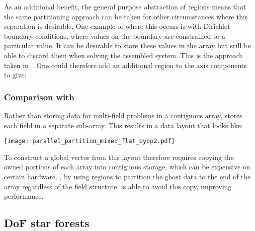 \documentclass[thesis]{subfiles}
\begin{document}
As an additional benefit, the general purpose abstraction of regions means that the same partitioning approach can be taken for other circumstances where this separation is desirable.
One example of where this occurs is with Dirichlet boundary conditions, where values on the boundary are constrained to a particular value.
It can be desirable to store these values in the array but still be able to discard them when solving the assembled system.
This is the approach taken in~\cite{rothwellImplementingRestrictedFunction2024}.
One could therefore add an additional region to the axis components to give:
\begin{pyinline}
\end{pyinline}

\subsubsection{Comparison with }

Rather than storing data for multi-field problems in a contiguous array,  stores each field in a separate sub-array.
This results in a data layout that looks like:
\begin{center}
  \texttt{[image: parallel\_partition\_mixed\_flat\_pyop2.pdf]}
\end{center}
To construct a global vector from this layout therefore requires copying the owned portions of each array into contiguous storage, which can be expensive on certain hardware.
, by using regions to partition the ghost data to the end of the array regardless of the field structure, is able to avoid this copy, improving performance.

\subsection{DoF star forests}
\label{sec:parallel_star_forests}
\end{document}
